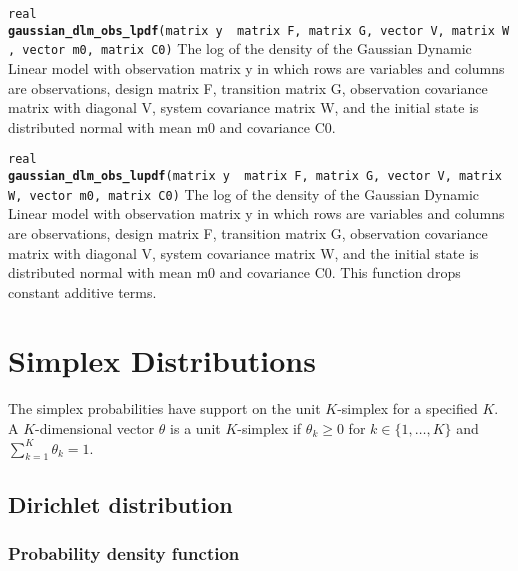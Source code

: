 \documentclass[
  10pt,
]{book}
\begin{document}
\texttt{real} \textbf{\texttt{gaussian\_dlm\_obs\_lpdf}}\texttt{(matrix\ y\ \textbar{}\ matrix\ F,\ matrix\ G,\ vector\ V,\ matrix\ W,\ vector\ m0,\ matrix\ C0)}\newline
The log of the density of the Gaussian Dynamic Linear model with
observation matrix y in which rows are variables and columns are
observations, design matrix F, transition matrix G, observation
covariance matrix with diagonal V, system covariance matrix W, and the
initial state is distributed normal with mean m0 and covariance C0.


\texttt{real} \textbf{\texttt{gaussian\_dlm\_obs\_lupdf}}\texttt{(matrix\ y\ \textbar{}\ matrix\ F,\ matrix\ G,\ vector\ V,\ matrix\ W,\ vector\ m0,\ matrix\ C0)}\newline
The log of the density of the Gaussian Dynamic Linear model with
observation matrix y in which rows are variables and columns are
observations, design matrix F, transition matrix G, observation
covariance matrix with diagonal V, system covariance matrix W, and the
initial state is distributed normal with mean m0 and covariance C0.
This function drops constant additive terms.

\hypertarget{simplex-distributions}{%
\chapter{Simplex Distributions}\label{simplex-distributions}}

The simplex probabilities have support on the unit \(K\)-simplex for a
specified \(K\). A \(K\)-dimensional vector \(\theta\) is a unit
\(K\)-simplex if \(\theta_k \geq 0\) for \(k \in \{1,\ldots,K\}\) and
\(\sum_{k = 1}^K \theta_k = 1\).

\hypertarget{dirichlet-distribution}{%
\section{Dirichlet distribution}\label{dirichlet-distribution}}

\hypertarget{probability-density-function-31}{%
\subsection{Probability density function}\label{probability-density-function-31}}
\end{document}
